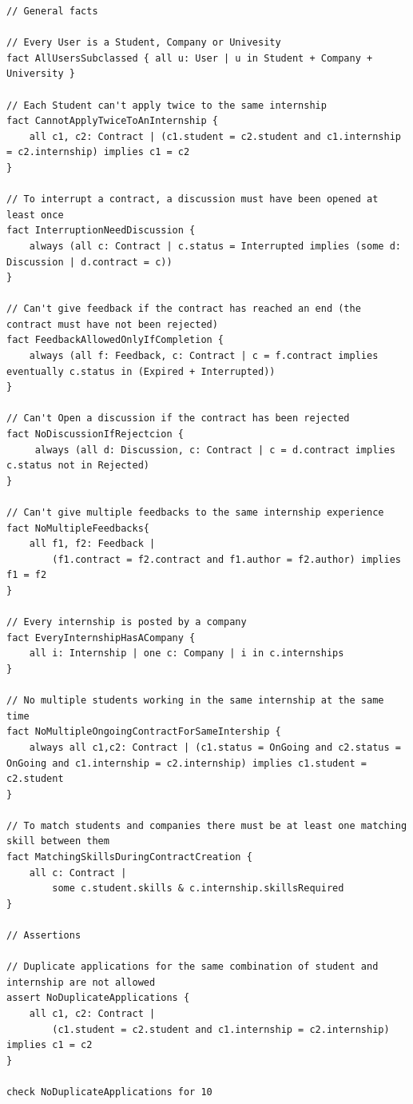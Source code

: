 \begin{verbatim}
// General facts

// Every User is a Student, Company or Univesity
fact AllUsersSubclassed { all u: User | u in Student + Company + University }

// Each Student can't apply twice to the same internship
fact CannotApplyTwiceToAnInternship {
	all c1, c2: Contract | (c1.student = c2.student and c1.internship = c2.internship) implies c1 = c2
}

// To interrupt a contract, a discussion must have been opened at least once
fact InterruptionNeedDiscussion {
    always (all c: Contract | c.status = Interrupted implies (some d: Discussion | d.contract = c))
}

// Can't give feedback if the contract has reached an end (the contract must have not been rejected)
fact FeedbackAllowedOnlyIfCompletion {
    always (all f: Feedback, c: Contract | c = f.contract implies eventually c.status in (Expired + Interrupted))
}

// Can't Open a discussion if the contract has been rejected
fact NoDiscussionIfRejectcion {
	 always (all d: Discussion, c: Contract | c = d.contract implies c.status not in Rejected)
}

// Can't give multiple feedbacks to the same internship experience
fact NoMultipleFeedbacks{
    all f1, f2: Feedback |
        (f1.contract = f2.contract and f1.author = f2.author) implies f1 = f2
}

// Every internship is posted by a company
fact EveryInternshipHasACompany {
    all i: Internship | one c: Company | i in c.internships
}

// No multiple students working in the same internship at the same time
fact NoMultipleOngoingContractForSameIntership {
    always all c1,c2: Contract | (c1.status = OnGoing and c2.status = OnGoing and c1.internship = c2.internship) implies c1.student = c2.student
}

// To match students and companies there must be at least one matching skill between them
fact MatchingSkillsDuringContractCreation {
    all c: Contract |
        some c.student.skills & c.internship.skillsRequired
}

// Assertions

// Duplicate applications for the same combination of student and internship are not allowed
assert NoDuplicateApplications {
    all c1, c2: Contract |
        (c1.student = c2.student and c1.internship = c2.internship) implies c1 = c2
}

check NoDuplicateApplications for 10


\end{verbatim}
